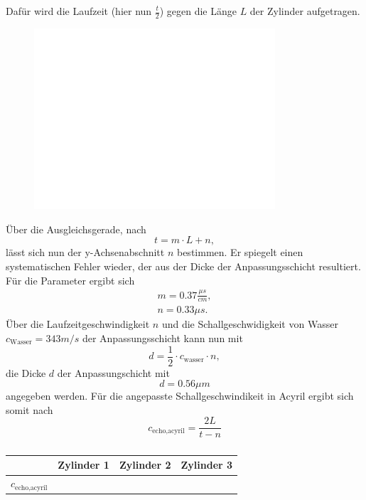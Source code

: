 Dafür wird die Laufzeit (hier nun $\frac{t}{2}$) gegen die Länge $L$ der Zylinder aufgetragen.
\begin{figure}[H]
    \centering
    \includegraphics[width=0.8\textwidth]{plots/laufzeit.pdf}
    \caption{}
\end{figure}
Über die Ausgleichsgerade, nach
\begin{equation}
    t=m \cdot L+n,
\end{equation}
lässt sich nun der y-Achsenabschnitt $n$ bestimmen.
Er spiegelt einen systematischen Fehler wieder, der aus der Dicke der Anpassungsschicht
resultiert.\\ 
Für die Parameter ergibt sich
\begin{align*}
    m=0.37\frac{\mu s}{cm},\\
    n=0.33\mu s.
\end{align*}
Über die Laufzeitgeschwindigkeit $n$ und die Schallgeschwidigkeit von Wasser
$c_{\text{Wasser}}=343m/s$ der Anpassungsschicht kann nun mit
\begin{equation}
    d=\frac{1}{2} \cdot c_{\text{wasser}} \cdot n,
\end{equation}
die Dicke $d$ der Anpassungschicht mit
\begin{equation}
    d=0.56\mu m
\end{equation}
angegeben werden.
Für die angepasste Schallgeschwindikeit in Acyril ergibt sich somit nach
\begin{equation}
    c_{\text{echo,acyril}}=\frac{2L}{t-n}
\end{equation}
\begin{table}
    \centering
    \begin{tabular}{c| c c c}
        \toprule
        &Zylinder 1&Zylinder 2&Zylinder 3\\
        \midrule
        $c_{\text{echo,acyril}}$&&&\\
        \bottomrule
    \end{tabular}
    \caption{}
\end{table}


